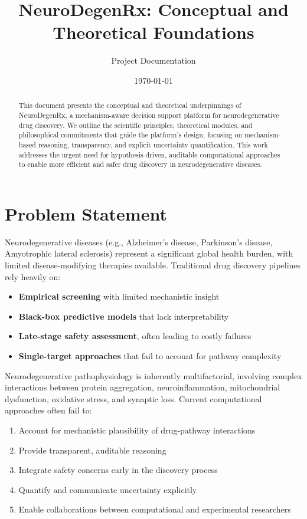 \documentclass[12pt,a4paper]{article}
\title{\textbf{NeuroDegenRx: Conceptual and Theoretical Foundations}}
\author{Project Documentation}
\date{\today}
\begin{document}
\maketitle

\begin{abstract}
This document presents the conceptual and theoretical underpinnings of NeuroDegenRx, a mechanism-aware decision support platform for neurodegenerative drug discovery. We outline the scientific principles, theoretical modules, and philosophical commitments that guide the platform's design, focusing on mechanism-based reasoning, transparency, and explicit uncertainty quantification. This work addresses the urgent need for hypothesis-driven, auditable computational approaches to enable more efficient and safer drug discovery in neurodegenerative diseases.
\end{abstract}

\tableofcontents
\newpage

\section{Problem Statement}
\label{sec:problem}

Neurodegenerative diseases (e.g., Alzheimer's disease, Parkinson's disease, Amyotrophic lateral sclerosis) represent a significant global health burden, with limited disease-modifying therapies available. Traditional drug discovery pipelines rely heavily on:
\begin{itemize}
  \item \textbf{Empirical screening} with limited mechanistic insight
  \item \textbf{Black-box predictive models} that lack interpretability
  \item \textbf{Late-stage safety assessment}, often leading to costly failures
  \item \textbf{Single-target approaches} that fail to account for pathway complexity
\end{itemize}

Neurodegenerative pathophysiology is inherently multifactorial, involving complex interactions between protein aggregation, neuroinflammation, mitochondrial dysfunction, oxidative stress, and synaptic loss. Current computational approaches often fail to:
\begin{enumerate}
  \item Account for mechanistic plausibility of drug-pathway interactions
  \item Provide transparent, auditable reasoning
  \item Integrate safety concerns early in the discovery process
  \item Quantify and communicate uncertainty explicitly
  \item Enable collaborations between computational and experimental researchers
\end{enumerate}
\end{document}
